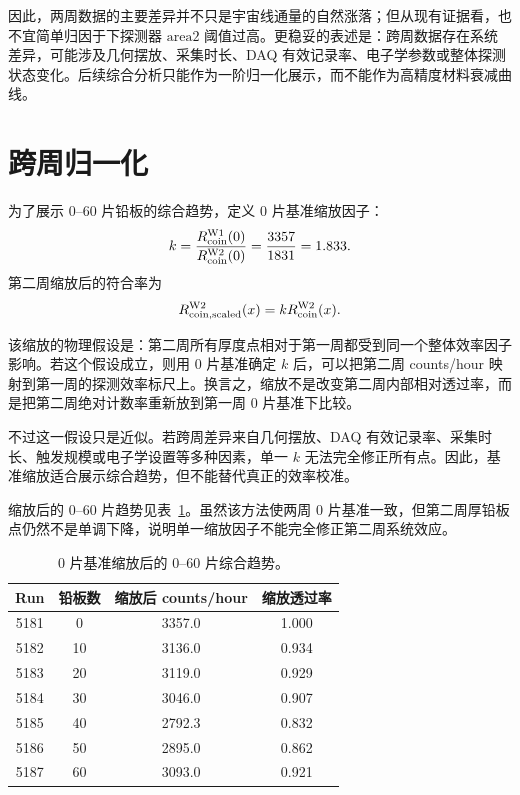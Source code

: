 \documentclass[aps,prl,twocolumn,superscriptaddress,nofootinbib]{revtex4-2}
\begin{document}
因此，两周数据的主要差异并不只是宇宙线通量的自然涨落；但从现有证据看，也不宜简单归因于下探测器 \(\mathrm{area2}\) 阈值过高。更稳妥的表述是：跨周数据存在系统差异，可能涉及几何摆放、采集时长、DAQ 有效记录率、电子学参数或整体探测状态变化。后续综合分析只能作为一阶归一化展示，而不能作为高精度材料衰减曲线。

\section{跨周归一化}

为了展示 0--60 片铅板的综合趋势，定义 0 片基准缩放因子：
\begin{equation}
k=\frac{R_{\rm coin}^{\rm W1}(0)}{R_{\rm coin}^{\rm W2}(0)}
=\frac{3357}{1831}=1.833.
\end{equation}
第二周缩放后的符合率为
\begin{equation}
R_{\rm coin,scaled}^{\rm W2}(x)=kR_{\rm coin}^{\rm W2}(x).
\end{equation}

该缩放的物理假设是：第二周所有厚度点相对于第一周都受到同一个整体效率因子影响。若这个假设成立，则用 0 片基准确定 $k$ 后，可以把第二周 counts/hour 映射到第一周的探测效率标尺上。换言之，缩放不是改变第二周内部相对透过率，而是把第二周绝对计数率重新放到第一周 0 片基准下比较。

不过这一假设只是近似。若跨周差异来自几何摆放、DAQ 有效记录率、采集时长、触发规模或电子学设置等多种因素，单一 $k$ 无法完全修正所有点。因此，基准缩放适合展示综合趋势，但不能替代真正的效率校准。

缩放后的 0--60 片趋势见表~\ref{tab:combined}。虽然该方法使两周 0 片基准一致，但第二周厚铅板点仍然不是单调下降，说明单一缩放因子不能完全修正第二周系统效应。

\begin{table}[h]
\caption{0 片基准缩放后的 0--60 片综合趋势。}
\label{tab:combined}
\begin{ruledtabular}
\begin{tabular}{cccc}
Run & 铅板数 & 缩放后 counts/hour & 缩放透过率\\
\hline
5181 & 0  & 3357.0 & 1.000\\
5182 & 10 & 3136.0 & 0.934\\
5183 & 20 & 3119.0 & 0.929\\
5184 & 30 & 3046.0 & 0.907\\
5185 & 40 & 2792.3 & 0.832\\
5186 & 50 & 2895.0 & 0.862\\
5187 & 60 & 3093.0 & 0.921\\
\end{tabular}
\end{ruledtabular}
\end{table}
\end{document}
